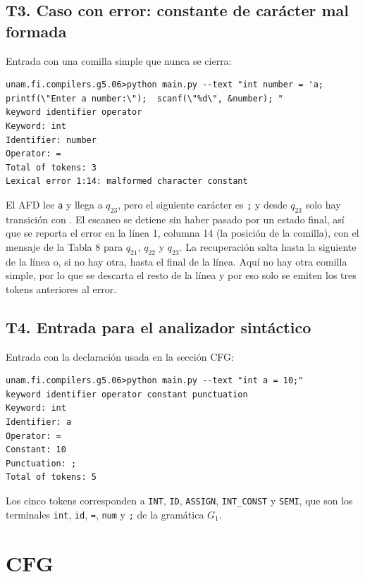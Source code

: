 \documentclass[12pt,letterpaper]{article}
\newcommand{\cd}[1]{\texttt{#1}}                       %
\begin{document}
\subsection{T3. Caso con error: constante de carácter mal formada}

Entrada con una comilla simple que nunca se cierra:

\begin{lstlisting}
unam.fi.compilers.g5.06>python main.py --text "int number = 'a; printf(\"Enter a number:\");  scanf(\"%d\", &number); "
keyword identifier operator
Keyword: int
Identifier: number
Operator: =
Total of tokens: 3
Lexical error 1:14: malformed character constant
\end{lstlisting}

El AFD lee \cd{\textquotesingle a} y llega a $q_{23}$, pero el siguiente carácter es \cd{;} y desde $q_{23}$ solo hay transición con \cd{\textquotesingle}. El escaneo se detiene sin haber pasado por un estado final, así que se reporta el error en la línea 1, columna 14 (la posición de la comilla), con el mensaje de la Tabla 8 para $q_{21}$, $q_{22}$ y $q_{23}$. La recuperación salta hasta la siguiente \cd{\textquotesingle} de la línea o, si no hay otra, hasta el final de la línea. Aquí no hay otra comilla simple, por lo que se descarta el resto de la línea y por eso solo se emiten los tres tokens anteriores al error.

\subsection{T4. Entrada para el analizador sintáctico}

Entrada con la declaración usada en la sección CFG:

\begin{lstlisting}
unam.fi.compilers.g5.06>python main.py --text "int a = 10;"
keyword identifier operator constant punctuation
Keyword: int
Identifier: a
Operator: =
Constant: 10
Punctuation: ;
Total of tokens: 5
\end{lstlisting}

Los cinco tokens corresponden a \cd{INT}, \cd{ID}, \cd{ASSIGN}, \cd{INT\_CONST} y \cd{SEMI}, que son los terminales \cd{int}, \cd{id}, \cd{=}, \cd{num} y \cd{;} de la gramática $G_1$.

\section{CFG}
\end{document}
